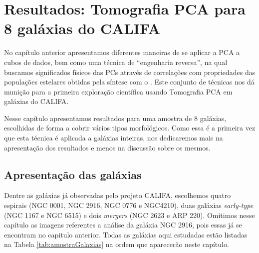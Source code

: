 


\chapter{Resultados: Tomografia PCA para 8 galáxias do CALIFA}
\label{sec:result}

No capítulo anterior apresentamos diferentes maneiras de se aplicar a PCA a cubos de dados, bem como uma técnica de
``engenharia reversa'', na qual buscamos significados físicos das PCs através de correlações com propriedades das
populações estelares obtidas pela síntese com o \starlight. Este conjunto de técnicas nos dá munição para a primeira
exploração científica usando Tomografia PCA em galáxias do CALIFA. 

Nesse capítulo apresentamos resultados para uma amostra de 8 galáxias, escolhidas de forma a cobrir vários tipos
morfológicos. Como essa é a primeira vez que esta técnica é aplicada a galáxias inteiras, nos dedicaremos mais na
apresentação dos resultados e menos na discussão sobre os mesmos. 

\section{Apresentação das galáxias}
\label{sec:result:apres}

Dentre as galáxias já observadas pelo projeto CALIFA, escolhemos quatro espirais (NGC 0001, NGC 2916, NGC 0776 e
NGC4210), duas galáxias {\em early-type} (NGC 1167 e NGC 6515) e dois {\em mergers} (NGC 2623 e ARP 220). Omitimos nesse
capítulo as imagens referentes a análise da galáxia NGC 2916, pois essas já se encontram no capitulo anterior. Todas as
galáxias aqui estudadas estão listadas na Tabela \ref{tab:amostraGalaxias} na ordem que aparecerão neste capítulo.

